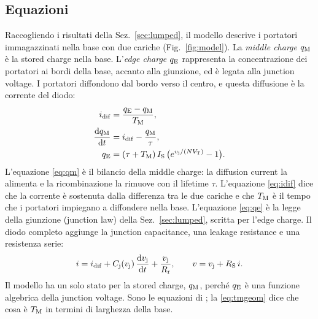 \documentclass[10pt,a4paper]{scrartcl}
\let\newcommand\pdvaluedefine
\newcommand{\TM}{T_\mathrm{M}}
\newcommand{\qE}{q_\mathrm{E}}
\newcommand{\qM}{q_\mathrm{M}}
\newcommand{\idif}{i_\mathrm{dif}}
\newcommand{\vj}{v_\mathrm{j}}
\newcommand{\IS}{I_\mathrm{S}}
\newcommand{\RS}{R_\mathrm{S}}
\newcommand{\Rr}{R_\mathrm{r}}
\newcommand{\VT}{V_\mathrm{T}}
\newcommand{\Cj}{C_\mathrm{j}}
\newcommand{\diff}{\mathrm{d}}
\newcommand{\Nem}{N}                          %
\begin{document}
\subsection{Equazioni}
Raccogliendo i risultati della Sez.~\ref{sec:lumped}, il modello descrive i portatori immagazzinati nella base con due cariche (Fig.~\ref{fig:model}). La \emph{middle charge} $\qM$ è la stored charge nella base. L'\emph{edge charge} $\qE$ rappresenta la concentrazione dei portatori ai bordi della base, accanto alla giunzione, ed è legata alla junction voltage. I portatori diffondono dal bordo verso il centro, e questa diffusione è la corrente del diodo:
\begin{align}
\idif &= \frac{\qE - \qM}{\TM} , \label{eq:idif}\\
\frac{\diff \qM}{\diff t} &= \idif - \frac{\qM}{\tau} , \label{eq:qm}\\
\qE &= (\tau+\TM)\,\IS\,\bigl(e^{\vj/(\Nem\VT)} - 1\bigr) . \label{eq:qe}
\end{align}
L'equazione \eqref{eq:qm} è il bilancio della middle charge: la diffusion current la alimenta e la ricombinazione la rimuove con il lifetime $\tau$. L'equazione \eqref{eq:idif} dice che la corrente è sostenuta dalla differenza tra le due cariche e che $\TM$ è il tempo che i portatori impiegano a diffondere nella base. L'equazione \eqref{eq:qe} è la legge della giunzione (junction law) della Sez.~\ref{sec:lumped}, scritta per l'edge charge. Il diodo completo aggiunge la junction capacitance, una leakage resistance e una resistenza serie:
\begin{equation}
i = \idif + \Cj(\vj)\,\frac{\diff \vj}{\diff t} + \frac{\vj}{\Rr} , \qquad v = \vj + \RS\, i .
\label{eq:terminal}
\end{equation}
Il modello ha un solo stato per la stored charge, $\qM$, perché $\qE$ è una funzione algebrica della junction voltage. Sono le equazioni di \cite{lauritzen1991}; la \eqref{eq:tmgeom} dice che cosa è $\TM$ in termini di larghezza della base.
\end{document}
